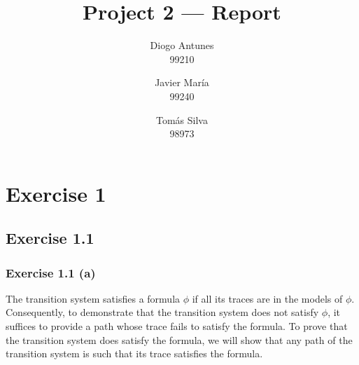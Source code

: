 \documentclass[12pt]{article}
\newcommand{\drafter}[1]{#1}
\begin{document}
\title{Project 2 — Report}
\author{
  Diogo Antunes\\
  99210
  \and
  Javier María\\
  99240
  \and
  Tomás Silva\\
  98973
}

\maketitle

\section*{Exercise 1}

\subsection*{Exercise 1.1}

\subsubsection*{Exercise 1.1 (a)}

\drafter{The transition system satisfies a formula $\phi$ if all its traces are in the models of $\phi$.}
\drafter{Consequently, to demonstrate that the transition system does not satisfy $\phi$, it suffices to provide a path whose trace fails to satisfy the formula.}
\drafter{To prove that the transition system does satisfy the formula, we will show that any path of the transition system is such that its trace satisfies the formula.}
\end{document}

